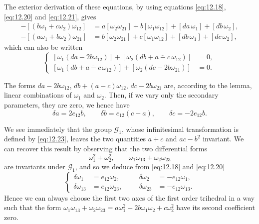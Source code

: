 \documentclass[leqno,11pt]{book}
\numberwithin{equation}{chapter}
\theoremstyle{shape1}
\theoremstyle{shapesmall}
\begin{document}
The exterior derivation of these equations, by using equations \eqref{eq:12.18}, \eqref{eq:12.20} and \eqref{eq:12.21}, gives
\begin{align*}
  -[(b\omega_{1}+c\omega_{2})\omega_{12}]&=a[\omega_{2}\omega_{21}]+b[\omega_{1}\omega_{12}]+[da\,\omega_{1}]+[db\,\omega_{2}],\\
  -[(a\omega_{1}+b\omega_{2})\omega_{21}]&=b[\omega_{2}\omega_{21}]+c[\omega_{1}\omega_{12}]+[db\,\omega_{1}]+[dc\,\omega_{2}],
\end{align*}
which can also be written
\begin{equation}
  \label{eq:12.22}
  \left\{
    \begin{aligned}
      [\omega_{1}(da-2b\omega_{12})]+[\omega_{2}(db+\overline{a-c}\,\omega_{12})]&=0,\\
      [\omega_{1}(db+\overline{a-c}\,\omega_{12})]+[\omega_{2}(dc-2b\omega_{21})]&=0.
    \end{aligned}
  \right.
\end{equation}

The forms $da-2b\omega_{12}$, $db+(a-c)\omega_{12}$, $dc-2b\omega_{21}$ are, according to the lemma, linear combinations of $\omega_{1}$ and $\omega_{2}$. Then, if we vary only the secondary parameters, they are zero, we hence have
\begin{equation}
  \label{eq:12.23}
  \delta a=2e_{12}b,\qquad\delta b=e_{12}(c-a),\qquad\delta c=-2e_{12}b.
\end{equation}

We see immediately that the group $\mathcal{G}_{1}$, whose infinitesimal transformation is defined by \eqref{eq:12.23}, leaves the two quantities $a+c$ and $ac-b^{2}$ invariant. We can recover this result by observing that the two differential forms
\begin{equation}
  \label{eq:12.24}
  \omega_{1}^{2}+\omega_{2}^{2},\qquad\omega_{1}\omega_{13}+\omega_{2}\omega_{23}
\end{equation}
are invariants under $\mathcal{G}_{1}$, and so we deduce from \eqref{eq:12.18} and \eqref{eq:12.20}
\begin{equation}
  \label{eq:12.25}
  \left\{
    \begin{aligned}
      \delta\omega_{1}&= e_{12}\omega_{2},&&&\delta\omega_{2}&=-e_{12}\omega_{1},\\
      \delta\omega_{13}&=e_{12}\omega_{23},&&&\delta\omega_{23}&=-e_{12}\omega_{13}.
    \end{aligned}
  \right.
\end{equation}
Hence we can always choose the first two axes of the first order trihedral in a way such that the form $\omega_{1}\omega_{13}+\omega_{2}\omega_{23}=a\omega_{1}^{2}+2b\omega_{1}\omega_{2}+c\omega_{2}^{2}$ have its second coefficient zero.
\end{document}
